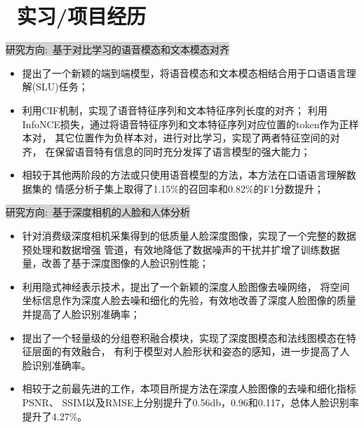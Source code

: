 \documentclass{resume}
\begin{document}
\section{\faUsers\ 实习/项目经历}
\colorbox{lightgray}{研究方向:\ 基于对比学习的语音模态和文本模态对齐}
\href{https://arxiv.org/abs/2204.10461}{\textcolor{linkcolor}{\faExternalLink}}
\begin{itemize}[parsep=1.0ex]
  \item 提出了一个新颖的端到端模型，将语音模态和文本模态相结合用于口语语言理解(SLU)任务；
  \item 利用CIF机制，实现了语音特征序列和文本特征序列长度的对齐；
        利用InfoNCE损失，通过将语音特征序列和文本特征序列对应位置的token作为正样本对，
        其它位置作为负样本对，进行对比学习，实现了两者特征空间的对齐，
        在保留语音特有信息的同时充分发挥了语言模型的强大能力；
  \item 相较于其他两阶段的方法或只使用语音模型的方法，本方法在口语语言理解数据集的
        情感分析子集上取得了1.15\%的召回率和0.82\%的F1分数提升；
\end{itemize}
\colorbox{lightgray}{研究方向:\ 基于深度相机的人脸和人体分析}
\href{https://www.sciencedirect.com/science/article/pii/S0031320323006349}{\textcolor{linkcolor}{\faExternalLink{}}}
\begin{itemize}[parsep=1.0ex]
  \item 针对消费级深度相机采集得到的低质量人脸深度图像，实现了一个完整的数据预处理和数据增强
        管道，有效地降低了数据噪声的干扰并扩增了训练数据量，改善了基于深度图像的人脸识别性能；
  \item 利用隐式神经表示技术，提出了一个新颖的深度人脸图像去噪网络，
        将空间坐标信息作为深度人脸去噪和细化的先验，有效地改善了深度人脸图像的质量
        并提高了人脸识别准确率；
  \item 提出了一个轻量级的分组卷积融合模块，实现了深度图模态和法线图模态在特征层面的有效融合，
        有利于模型对人脸形状和姿态的感知，进一步提高了人脸识别准确率。
  \item 相较于之前最先进的工作，本项目所提方法在深度人脸图像的去噪和细化指标PSNR、
        SSIM以及RMSE上分别提升了0.56db，0.96和0.117，总体人脸识别率提升了4.27\%。
\end{itemize}
\end{document}
